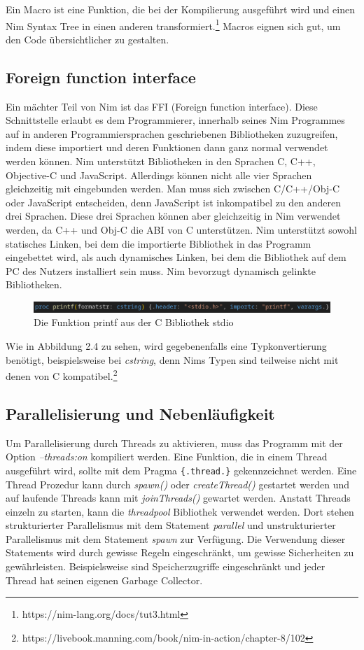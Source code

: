 \documentclass[11pt]{report}
\begin{document}
Ein Macro ist eine Funktion, die bei der Kompilierung ausgeführt wird und einen Nim Syntax Tree in einen anderen transformiert.\footnote{https://nim-lang.org/docs/tut3.html} Macros eignen sich gut, um den Code übersichtlicher zu gestalten.

\subsection{Foreign function interface}
Ein mächter Teil von Nim ist das FFI (Foreign function interface). Diese Schnittstelle erlaubt es dem Programmierer, innerhalb seines Nim Programmes auf in anderen Programmiersprachen geschriebenen Bibliotheken zuzugreifen, indem diese importiert und deren Funktionen dann ganz normal verwendet werden können. Nim unterstützt Bibliotheken in den Sprachen C, C++, Objective-C und JavaScript. Allerdings können nicht alle vier Sprachen gleichzeitig mit eingebunden werden. Man muss sich zwischen C/C++/Obj-C oder JavaScript entscheiden, denn JavaScript ist inkompatibel zu den anderen drei Sprachen. Diese drei Sprachen können aber gleichzeitig in Nim verwendet werden, da C++ und Obj-C die ABI von C unterstützen.
Nim unterstützt sowohl statisches Linken, bei dem die importierte Bibliothek in das Programm eingebettet wird, als auch dynamisches Linken, bei dem die Bibliothek auf dem PC des Nutzers installiert sein muss. Nim bevorzugt dynamisch gelinkte Bibliotheken.
\begin{figure}[htp]
\centering
\includegraphics[scale=0.40]{images/image3.png}
\caption{Die Funktion printf aus der C Bibliothek stdio}
\label{}
\end{figure}
Wie in Abbildung 2.4 zu sehen, wird gegebenenfalls eine Typkonvertierung benötigt, beispielsweise bei \emph{cstring}, denn Nims Typen sind teilweise nicht mit denen von C kompatibel.\footnote{https://livebook.manning.com/book/nim-in-action/chapter-8/102}

\subsection{Parallelisierung und Nebenläufigkeit}
Um Parallelisierung durch Threads zu aktivieren, muss das Programm mit der Option \emph{--threads:on} kompiliert werden. Eine Funktion, die in einem Thread ausgeführt wird, sollte mit dem Pragma \verb|{.thread.}| gekennzeichnet werden. Eine Thread Prozedur kann durch \emph{spawn()} oder \emph{createThread()} gestartet werden und auf laufende Threads kann mit \emph{joinThreads()} gewartet werden.
Anstatt Threads einzeln zu starten, kann die \emph{threadpool} Bibliothek verwendet werden. Dort stehen strukturierter Parallelismus mit dem Statement \emph{parallel} und unstrukturierter Parallelismus mit dem Statement \emph{spawn} zur Verfügung. Die Verwendung dieser Statements wird durch gewisse Regeln eingeschränkt, um gewisse Sicherheiten zu gewährleisten. Beispielsweise sind Speicherzugriffe eingeschränkt und jeder Thread hat seinen eigenen Garbage Collector.
\end{document}
